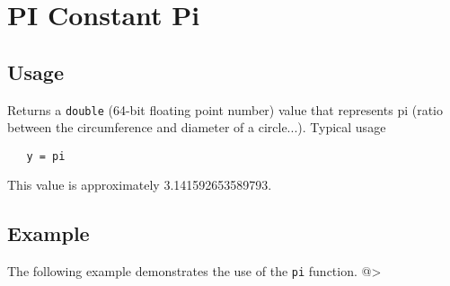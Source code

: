 \section{PI Constant Pi}

\subsection{Usage}

Returns a \verb|double| (64-bit floating point number) value that represents pi (ratio between the circumference and diameter of a circle...).  Typical usage 
\begin{verbatim}
   y = pi
\end{verbatim}
This value is approximately 3.141592653589793.
\subsection{Example}

The following example demonstrates the use of the \verb|pi| function.
@>
